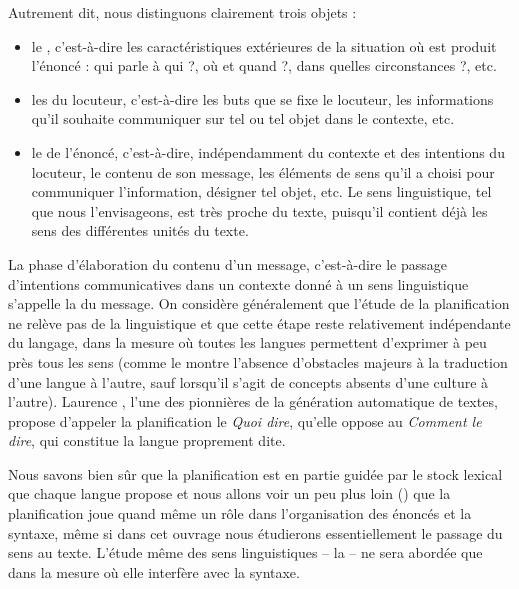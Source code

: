 Autrement dit, nous distinguons clairement trois objets :

\begin{itemize}
\item le , c’est-à-dire les caractéristiques extérieures de la situation où est produit l’énoncé : qui parle à qui ?, où et quand ?, dans quelles circonstances ?, etc.
\item les  du locuteur, c’est-à-dire les buts que se fixe le locuteur, les informations qu’il souhaite communiquer sur tel ou tel objet dans le contexte, etc.
\item le  de l’énoncé, c’est-à-dire, indépendamment du con\-texte et des intentions du locuteur, le contenu de son message, les éléments de sens qu’il a choisi pour communiquer l’information, désigner tel objet, etc. Le sens linguistique, tel que nous l’envisageons, est très proche du texte, puisqu’il contient déjà les sens des différentes unités du texte.
\end{itemize}

La phase d’élaboration du contenu d’un message, c’est-à-dire le passage d’intentions communicatives dans un contexte donné à un sens linguistique s’appelle la  du message. On considère généralement que l’étude de la planification ne relève pas de la linguistique et que cette étape reste relativement indépendante du langage, dans la mesure où toutes les langues permettent d’exprimer à peu près tous les sens (comme le montre l’absence d’obstacles majeurs à la traduction d’une langue à l’autre, sauf lorsqu’il s’agit de concepts absents d’une culture à l’autre). Laurence \citet{danlos1987generation}, l’une des pionnières de la génération automatique de textes, propose d’appeler la planification le \textit{Quoi dire}, qu’elle oppose au \textit{Comment le dire}, qui constitue la langue proprement dite.

Nous savons bien sûr que la planification est en partie guidée par le stock lexical que chaque langue propose et nous allons voir un peu plus loin () que la planification joue quand même un rôle dans l’organisation des énoncés et la syntaxe, même si dans cet ouvrage nous étudierons essentiellement le passage du sens au texte. L’étude même des sens linguistiques – la  – ne sera abordée que dans la mesure où elle interfère avec la syntaxe.


